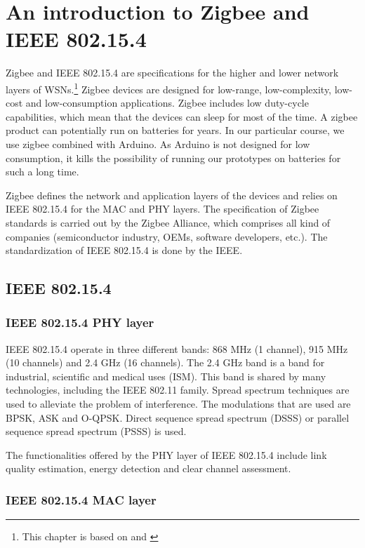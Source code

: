\chapter{An introduction to Zigbee and IEEE 802.15.4}

Zigbee and IEEE 802.15.4 are specifications for the higher and lower network layers of WSNs.\footnote{This chapter is based on \cite{baronti2007wsn} and \cite{farahani2008zwn}}
Zigbee devices are designed for low-range, low-complexity, low-cost and low-consumption applications.
Zigbee includes low duty-cycle capabilities, which mean that the devices can sleep for most of the time.
A zigbee product can potentially run on batteries for years.
In our particular course, we use zigbee combined with Arduino.
As Arduino is not designed for low consumption, it kills the possibility of running our prototypes on batteries for such a long time.

Zigbee defines the network and application layers of the devices and relies on IEEE 802.15.4 for the MAC and PHY layers.
The specification of Zigbee standards is carried out by the Zigbee Alliance, which comprises all kind of companies (semiconductor industry, OEMs, software developers, etc.).
The standardization of IEEE 802.15.4 is done by the IEEE.

\section{IEEE 802.15.4}

\subsection{IEEE 802.15.4 PHY layer}

IEEE 802.15.4 operate in three different bands: 868 MHz (1 channel), 915 MHz (10 channels) and 2.4 GHz (16 channels).
The 2.4 GHz band is a band for industrial, scientific and medical uses (ISM).
This band is shared by many technologies, including the IEEE 802.11 family.
Spread spectrum techniques are used to alleviate the problem of interference.
The modulations that are used are BPSK, ASK and O-QPSK.
Direct sequence spread spectrum (DSSS) or parallel sequence spread spectrum (PSSS) is used.

The functionalities offered by the PHY layer of IEEE 802.15.4 include link quality estimation, energy detection and clear channel assessment.

\subsection{IEEE 802.15.4 MAC layer}

